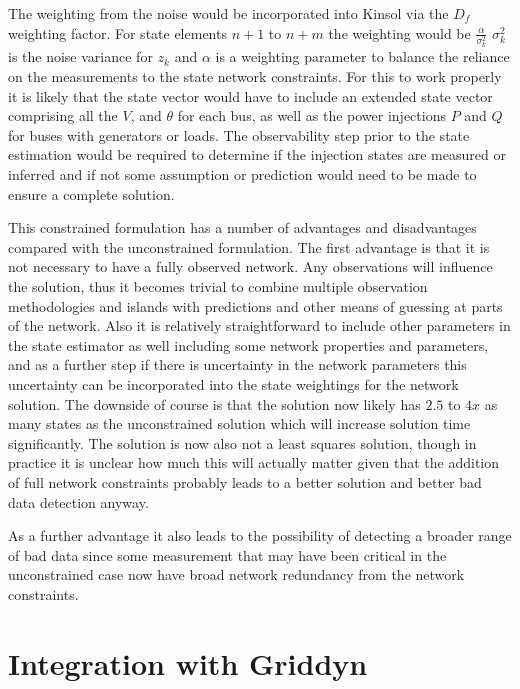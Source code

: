 \documentclass[11pt]{article} %
\begin{document}
The weighting from the noise would be incorporated into Kinsol via the $D_f$ weighting factor.  For state elements $n+1$ to $n+m$ the weighting would be $\frac{\alpha}{\sigma_k^2}$  $\sigma_k^2$ is the noise variance for $z_k$ and $\alpha$ is a weighting parameter to balance the reliance on the measurements to the state network constraints.  For this to work properly it is likely that the state vector would have to include an extended state vector comprising all the $V$, and $\theta$ for each bus,  as well as the power injections $P$ and $Q$ for buses with generators or loads.  The observability step prior to the state estimation would be required to determine if the injection states are measured or inferred and if not some assumption or prediction would need to be made to ensure a complete solution.

This constrained formulation has a number of advantages and disadvantages compared with the unconstrained formulation.  The first advantage is that it is not necessary to have a fully observed network.  Any observations will influence the solution, thus it becomes trivial to combine multiple observation methodologies and islands with predictions and other means of guessing at parts of the network.  Also it is relatively straightforward to include other parameters in the state estimator as well including some network properties and parameters, and as a further step if there is uncertainty in the network parameters this uncertainty can be incorporated into the state weightings for the network solution.  The downside of course is that the solution now likely has $2.5$ to $4x$ as many states as the unconstrained solution which will increase solution time significantly.  The solution is now also not a least squares solution,  though in practice it is unclear how much this will actually matter given that the addition of full network constraints probably leads to a better solution and better bad data detection anyway.

As a further advantage it also leads to the possibility of detecting a broader range of bad data since some measurement that may have been critical in the unconstrained case now have broad network redundancy from the network constraints.

\section{Integration with Griddyn}
\end{document}

